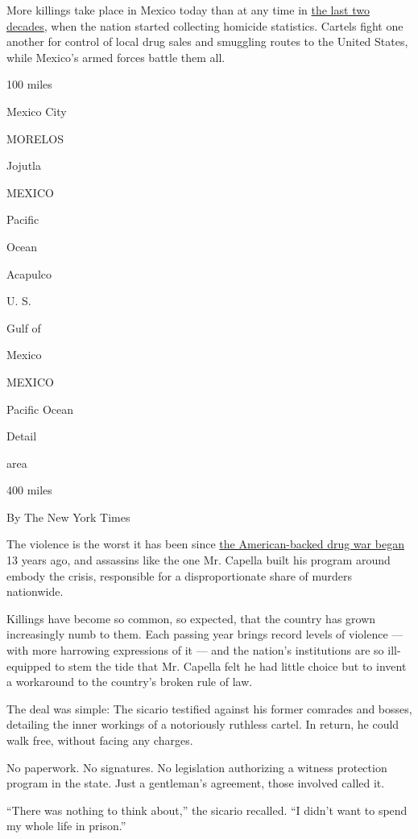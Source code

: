 More killings take place in Mexico today than at any time in
\href{https://www.nytimes3xbfgragh.onion/2017/08/04/world/americas/mexicos-drug-killings.html}{the
last two decades}, when the nation started collecting homicide
statistics. Cartels fight one another for control of local drug sales
and smuggling routes to the United States, while Mexico's armed forces
battle them all.

100 miles

Mexico City

MORELOS

Jojutla

MEXICO

Pacific

Ocean

Acapulco

U. S.

Gulf of

Mexico

MEXICO

Pacific Ocean

Detail

area

400 miles

By The New York Times

The violence is the worst it has been since
\href{https://www.nytimes3xbfgragh.onion/2019/12/11/world/americas/mexico-garcia-luna-indictment.html}{the
American-backed drug war began} 13 years ago, and assassins like the one
Mr. Capella built his program around embody the crisis, responsible for
a disproportionate share of murders nationwide.

Killings have become so common, so expected, that the country has grown
increasingly numb to them. Each passing year brings record levels of
violence --- with more harrowing expressions of it --- and the nation's
institutions are so ill-equipped to stem the tide that Mr. Capella felt
he had little choice but to invent a workaround to the country's broken
rule of law.

The deal was simple: The sicario testified against his former comrades
and bosses, detailing the inner workings of a notoriously ruthless
cartel. In return, he could walk free, without facing any charges.

No paperwork. No signatures. No legislation authorizing a witness
protection program in the state. Just a gentleman's agreement, those
involved called it.

``There was nothing to think about,'' the sicario recalled. ``I didn't
want to spend my whole life in prison.''

